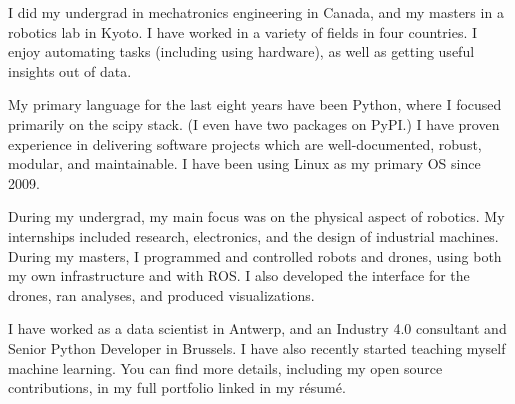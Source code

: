 I did my undergrad in mechatronics engineering in Canada, and my masters in a robotics lab in Kyoto. I have worked in a variety of fields in four countries. I enjoy automating tasks (including using hardware), as well as getting useful insights out of data.

My primary language for the last eight years have been Python, where I focused primarily on the scipy stack. (I even have two packages on PyPI.) I have proven experience in delivering software projects which are well-documented, robust, modular, and maintainable. I have been using Linux as my primary OS since 2009.

During my undergrad, my main focus was on the physical aspect of robotics. My internships included research, electronics, and the design of industrial machines. During my masters, I programmed and controlled robots and drones, using both my own infrastructure and with ROS. I also developed the interface for the drones, ran analyses, and produced visualizations.

I have worked as a data scientist in Antwerp, and an Industry 4.0 consultant and Senior Python Developer in Brussels.
I have also recently started teaching myself machine learning.
You can find more details, including my open source contributions, in my full portfolio linked in my r\'{e}sum\'{e}.
